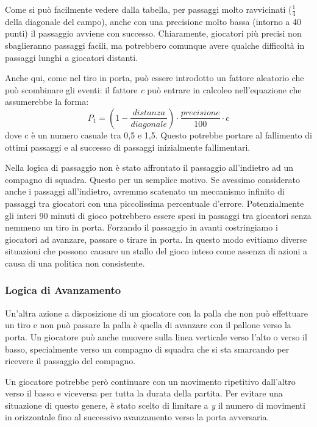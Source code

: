 \documentclass[aps,letterpaper,10pt]{article}
\begin{document}
Come si pu\`o facilmente vedere dalla tabella, per passaggi molto ravvicinati ($\frac{1}{4}$ della diagonale del campo), anche con una precisione molto bassa (intorno a 40 punti) il passaggio avviene con successo. Chiaramente, giocatori pi\`u precisi non sbaglieranno passaggi facili, ma potrebbero comunque avere qualche difficolt\`a in passaggi lunghi a giocatori distanti. \vspace{3mm}

Anche qui, come nel tiro in porta, pu\`o essere introdotto un fattore aleatorio che pu\`o scombinare gli eventi: il fattore \emph{c} pu\`o entrare in calcoleo nell'equazione che assumerebbe la forma: $$ P_1 = \left( 1 - \frac{distanza}{diagonale} \right) \cdot \frac{precisione}{100} \cdot c $$ dove c \`e un numero casuale tra 0,5 e 1,5. Questo potrebbe portare al fallimento di ottimi passaggi e al successo di passaggi inizialmente fallimentari. \vspace{3mm}

Nella logica di passaggio non \`e stato affrontato il passaggio all'indietro ad un compagno di squadra. Questo per un semplice motivo. Se avessimo considerato anche i passaggi all'indietro, avremmo scatenato un meccanismo infinito di passaggi tra giocatori con una piccolissima percentuale d'errore. Potenzialmente gli interi 90 minuti di gioco potrebbero essere spesi in passaggi tra giocatori senza nemmeno un tiro in porta. Forzando il passaggio in avanti costringiamo i giocatori ad avanzare, passare o tirare in porta. In questo modo evitiamo diverse situazioni che possono causare un stallo del gioco inteso come assenza di azioni a causa di una politica non consistente. \vspace{3mm}

\subsubsection{Logica di Avanzamento}
\label{avanzamento}

Un'altra azione a disposizione di un giocatore con la palla che non pu\`o effettuare un tiro e non pu\`o passare la palla \`e quella di avanzare con il pallone verso la porta. Un giocatore pu\`o anche muovere sulla linea verticale verso l'alto o verso il basso, specialmente verso un compagno di squadra che si sta smarcando per ricevere il passaggio del compagno. \vspace{3mm}

Un giocatore potrebbe per\`o continuare con un movimento ripetitivo dall'altro verso il basso e viceversa per tutta la durata della partita. Per evitare una situazione di questo genere, \`e stato scelto di limitare a \emph{y} il numero di movimenti in orizzontale fino al successivo avanzamento verso la porta avversaria. \vspace{3mm}
\end{document}
